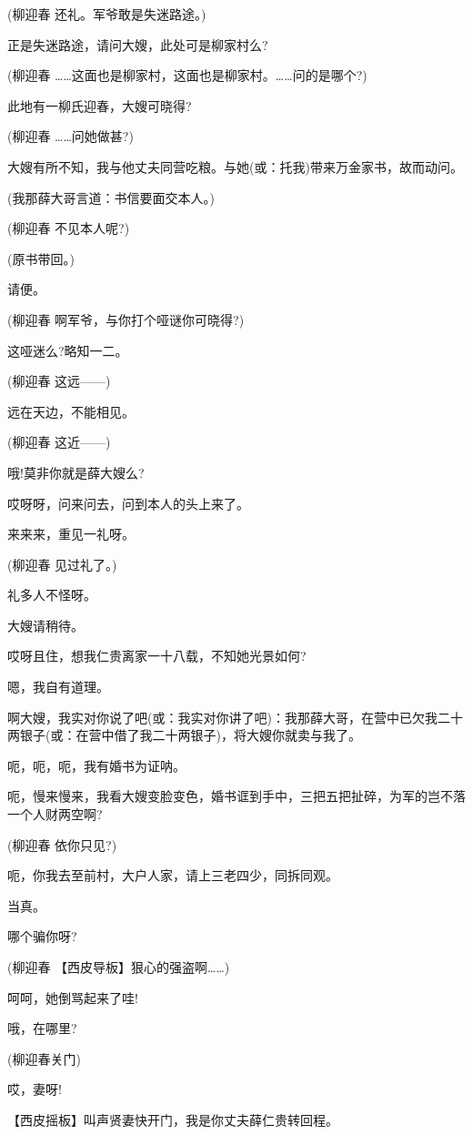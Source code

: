 (柳迎春 还礼。军爷敢是失迷路途。)

正是失迷路途，请问大嫂，此处可是柳家村么?

(柳迎春
\ldots{}\ldots{}这面也是柳家村，这面也是柳家村。\ldots{}\ldots{}问的是哪个?)

此地有一柳氏迎春，大嫂可晓得?

(柳迎春 \ldots{}\ldots{}问她做甚?)

大嫂有所不知，我与他丈夫同营吃粮。与她(或：托我)带来万金家书，故而动问。

(我那薛大哥言道：书信要面交本人。)

(柳迎春 不见本人呢?)

(原书带回。)

请便。

(柳迎春 啊军爷，与你打个哑谜你可晓得?)

这哑迷么?略知一二。

(柳迎春 这远------)

远在天边，不能相见。

(柳迎春 这近------)

哦!莫非你就是薛大嫂么?

哎呀呀，问来问去，问到本人的头上来了。

来来来，重见一礼呀。

(柳迎春 见过礼了。)

礼多人不怪呀。

大嫂请稍待。

哎呀且住，想我仁贵离家一十八载，不知她光景如何?

嗯，我自有道理。

啊大嫂，我实对你说了吧(或：我实对你讲了吧)：我那薛大哥，在营中已欠我二十两银子(或：在营中借了我二十两银子)，将大嫂你就卖与我了。

呃，呃，呃，我有婚书为证呐。

呃，慢来慢来，我看大嫂变脸变色，婚书诓到手中，三把五把扯碎，为军的岂不落一个人财两空啊?

(柳迎春 依你只见?)

呃，你我去至前村，大户人家，请上三老四少，同拆同观。

当真。

哪个骗你呀?

(柳迎春 【西皮导板】狠心的强盗啊\ldots{}\ldots{})

呵呵，她倒骂起来了哇!

哦，在哪里?

(柳迎春关门)

哎，妻呀!

【西皮摇板】叫声贤妻快开门，我是你丈夫薛仁贵转回程。

